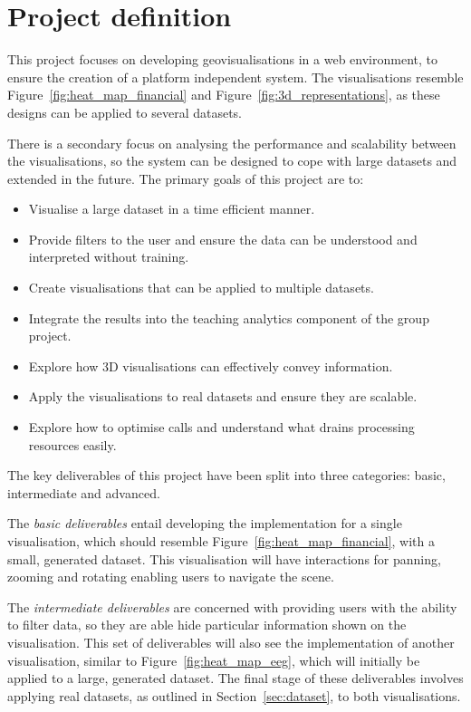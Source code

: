 \section{Project definition} {
\label{sec:project_definition}

	This project focuses on developing geovisualisations in a web environment, to ensure the creation of a platform independent system. The visualisations resemble Figure~\ref{fig:heat_map_financial} and Figure~\ref{fig:3d_representations}, as these designs can be applied to several datasets.

	

	There is a secondary focus on analysing the performance and scalability between the visualisations, so the system can be designed to cope with large datasets and extended in the future. The primary goals of this project are to:

	\begin{itemize}
		\item Visualise a large dataset in a time efficient manner.
		\item Provide filters to the user and ensure the data can be understood and interpreted without training.
		\item Create visualisations that can be applied to multiple datasets.
		\item Integrate the results into the teaching analytics component of the group project.
		\item Explore how 3D visualisations can effectively convey information.
		\item Apply the visualisations to real datasets and ensure they are scalable.
		\item Explore how to optimise calls and understand what drains processing resources easily.
	\end{itemize}

	The key deliverables of this project have been split into three categories: basic, intermediate and advanced.

	The \emph{basic deliverables} entail developing the implementation for a single visualisation, which should resemble Figure~\ref{fig:heat_map_financial}, with a small, generated dataset. This visualisation will have interactions for panning, zooming and rotating enabling users to navigate the scene.

	The \emph{intermediate deliverables} are concerned with providing users with the ability to filter data, so they are able hide particular information shown on the visualisation. This set of deliverables will also see the implementation of another visualisation, similar to Figure~\ref{fig:heat_map_eeg}, which will initially be applied to a large, generated dataset. The final stage of these deliverables involves applying real datasets, as outlined in Section~\ref{sec:dataset}, to both visualisations.

}
